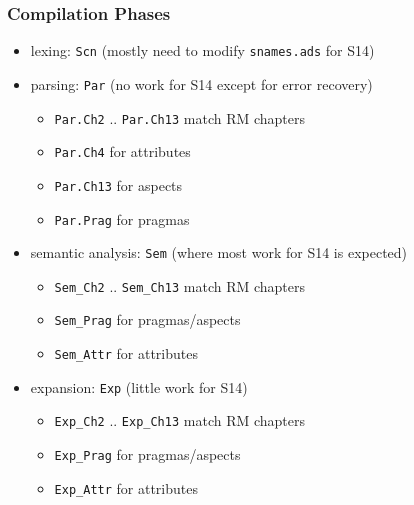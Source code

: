 \documentclass{beamer}
\newenvironment{specialframe}{%
  \begin{frame}[fragile,environment=specialframe]}{\end{frame}}
\begin{document}
\begin{specialframe}
  \frametitle{Compilation Phases}

\begin{itemize}
\item lexing: \verb|Scn| (mostly need to modify \verb|snames.ads| for S14)
\item parsing: \verb|Par| (no work for S14 except for error recovery)
  \begin{itemize}
  \item \verb|Par.Ch2| .. \verb|Par.Ch13| match RM chapters
  \item \verb|Par.Ch4| for attributes
  \item \verb|Par.Ch13| for aspects
  \item \verb|Par.Prag| for pragmas
  \end{itemize}
\item semantic analysis: \verb|Sem| (where most work for S14 is expected)
  \begin{itemize}
  \item \verb|Sem_Ch2| .. \verb|Sem_Ch13| match RM chapters
  \item \verb|Sem_Prag| for pragmas/aspects
  \item \verb|Sem_Attr| for attributes
  \end{itemize}
\item expansion: \verb|Exp| (little work for S14)
  \begin{itemize}
  \item \verb|Exp_Ch2| .. \verb|Exp_Ch13| match RM chapters
  \item \verb|Exp_Prag| for pragmas/aspects
  \item \verb|Exp_Attr| for attributes
  \end{itemize}
\end{itemize}

\end{specialframe}
\end{document}
